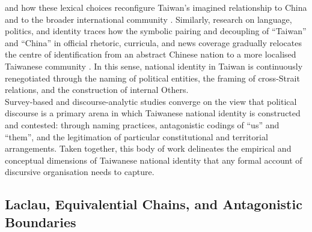 \documentclass[man,12pt]{apa7}
\begin{document}
and how these lexical choices reconfigure Taiwan's imagined relationship to China and to the broader international community \parencite{chang2011}. 
Similarly, research on language, politics, and identity traces how the symbolic pairing and decoupling of ``Taiwan'' and ``China'' in official rhetoric, curricula, and news coverage 
gradually relocates the centre of identification from an abstract Chinese nation to a more localised Taiwanese community \parencite{wu2007}. 
In this sense, national identity in Taiwan is continuously renegotiated through the naming of political entities, the framing of cross-Strait relations, and the construction of internal Others.\\%
Survey-based and discourse-analytic studies converge on the view that political discourse is a primary arena in which Taiwanese national identity is constructed and contested: 
through naming practices, antagonistic codings of ``us'' and ``them'', and the legitimation of particular constitutional and territorial arrangements. 
Taken together, this body of work delineates the empirical and conceptual dimensions of Taiwanese national identity that any formal account of discursive organisation needs to capture.\\%
\subsection{Laclau, Equivalential Chains, and Antagonistic Boundaries}
\end{document}
